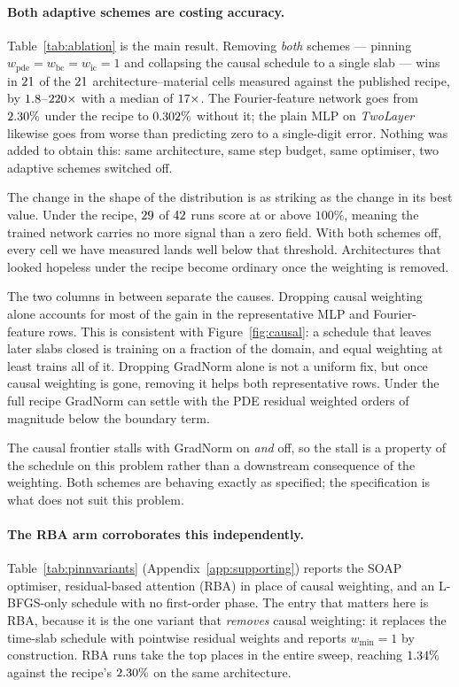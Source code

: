 \paragraph{Both adaptive schemes are costing accuracy.}

Table~\ref{tab:ablation} is the main result. Removing \emph{both} schemes ---
pinning $w_{\mathrm{pde}} = w_{\mathrm{bc}} = w_{\mathrm{ic}} = 1$ and
collapsing the causal schedule to a single slab --- wins in
$21$ of the $21$ architecture--material cells measured against
the published recipe, by
$1.8$--$220\times$ with a median of
$17\times$. The Fourier-feature network goes from
$2.30\%$ under the recipe to $0.302\%$ without it; the plain
MLP on \emph{TwoLayer} likewise goes from worse than predicting zero to a
single-digit error. Nothing was added to obtain this: same architecture, same
step budget, same optimiser, two adaptive schemes switched off.

The change in the shape of the distribution is as striking as the change in its
best value. Under the recipe, $29$ of $42$
runs score at or above $100\%$, meaning the trained network carries no more
signal than a zero field. With both schemes off, every cell we have measured
lands well below that threshold. Architectures that looked hopeless under the
recipe become ordinary once the weighting is removed.

The two columns in between separate the causes. Dropping causal weighting alone
accounts for most of the gain in the representative MLP and Fourier-feature
rows. This is consistent with Figure~\ref{fig:causal}: a schedule that leaves
later slabs closed is training on a fraction of the domain, and equal weighting
at least trains all of it. Dropping GradNorm alone is not a uniform fix, but
once causal weighting is gone, removing it helps both representative rows.
Under the full recipe GradNorm can settle with the PDE residual weighted orders
of magnitude below the boundary term.

The causal frontier stalls with GradNorm on \emph{and} off, so the stall is a
property of the schedule on this problem rather than a downstream consequence
of the weighting. Both schemes are behaving exactly as specified; the
specification is what does not suit this problem.

\paragraph{The RBA arm corroborates this independently.}
Table~\ref{tab:pinnvariants} (Appendix~\ref{app:supporting}) reports the SOAP
optimiser, residual-based attention (RBA) in place of causal weighting, and an
L-BFGS-only schedule with no first-order phase. The entry that matters here is RBA, because it is the one
variant that \emph{removes} causal weighting: it replaces the time-slab schedule
with pointwise residual weights and reports $w_{\min} = 1$ by construction. RBA
runs take the top places in the entire sweep, reaching $1.34\%$
against the recipe's $2.30\%$ on the same architecture.

